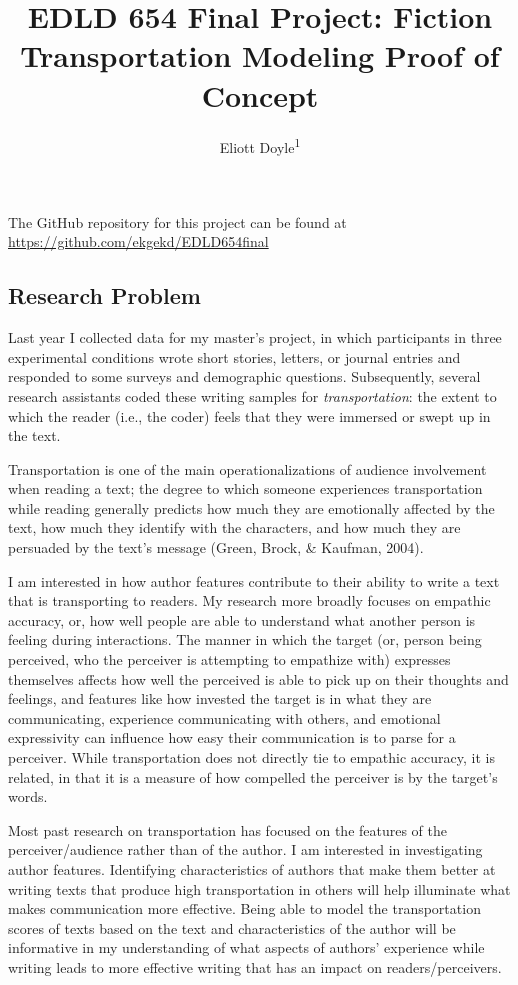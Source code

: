 \documentclass[
  man,floatsintext]{apa6}
\title{EDLD 654 Final Project: Fiction Transportation Modeling Proof of Concept}
\author{Eliott Doyle\textsuperscript{1}}
\date{}
\affiliation{\vspace{0.5cm}\textsuperscript{1} University of Oregon}
\begin{document}
\maketitle

The GitHub repository for this project can be found at \url{https://github.com/ekgekd/EDLD654final}

\hypertarget{research-problem}{%
\subsection{Research Problem}\label{research-problem}}

Last year I collected data for my master's project, in which participants in three experimental conditions wrote short stories, letters, or journal entries and responded to some surveys and demographic questions. Subsequently, several research assistants coded these writing samples for \emph{transportation}: the extent to which the reader (i.e., the coder) feels that they were immersed or swept up in the text.

Transportation is one of the main operationalizations of audience involvement when reading a text; the degree to which someone experiences transportation while reading generally predicts how much they are emotionally affected by the text, how much they identify with the characters, and how much they are persuaded by the text's message (Green, Brock, \& Kaufman, 2004).

I am interested in how author features contribute to their ability to write a text that is transporting to readers. My research more broadly focuses on empathic accuracy, or, how well people are able to understand what another person is feeling during interactions. The manner in which the target (or, person being perceived, who the perceiver is attempting to empathize with) expresses themselves affects how well the perceived is able to pick up on their thoughts and feelings, and features like how invested the target is in what they are communicating, experience communicating with others, and emotional expressivity can influence how easy their communication is to parse for a perceiver. While transportation does not directly tie to empathic accuracy, it is related, in that it is a measure of how compelled the perceiver is by the target's words.

Most past research on transportation has focused on the features of the perceiver/audience rather than of the author. I am interested in investigating author features. Identifying characteristics of authors that make them better at writing texts that produce high transportation in others will help illuminate what makes communication more effective. Being able to model the transportation scores of texts based on the text and characteristics of the author will be informative in my understanding of what aspects of authors' experience while writing leads to more effective writing that has an impact on readers/perceivers.
\end{document}
